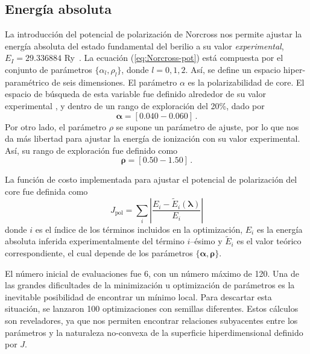 \subsection{Energía absoluta}

La introducción del potencial de polarización de Norcross nos permite
ajustar la energía absoluta del estado fundamental del berilio a su valor 
\textit{experimental}, $E_I=29.336884$ Ry~\cite{NIST}. La ecuación 
(\ref{eq:Norcross-pot}) está compuesta por el conjunto de parámetros 
$\{\alpha_l,\rho_l\}$, donde $l=0,1,2$. Así, se define un espacio 
hiper-paramétrico de seis dimensiones. El parámetro $\alpha$ es la 
polarizabilidad de core. El espacio de búsqueda de esta variable fue 
definido alrededor de su valor experimental \cite{Dalgarno:62,Sitz:71},
y dentro de un rango de exploración del 20\%, dado por
\begin{equation}
\boldsymbol\alpha=[0.040-0.060]\,.
\end{equation}
Por otro lado, el parámetro $\rho$ se supone un parámetro de ajuste, por 
lo que nos da más libertad para ajustar la energía de ionización con su 
valor experimental. Así, su rango de exploración fue definido como
\begin{equation}
\boldsymbol\rho=[0.50-1.50]\,.
\end{equation}

La función de costo implementada para ajustar el potencial de 
polarización del core fue definida como
\begin{equation}
J_{\mathrm{pol}} = \sum_{i} \left|\frac{E_{i}-\tilde{E}_{i}
(\boldsymbol{\lambda})}{E_{i}} \right|
\label{eq:Jpol}
\end{equation}
donde $i$ es el índice de los términos incluidos en la optimización, 
$E_{i}$ es la energía absoluta inferida experimentalmente del 
término $i$--ésimo y $\tilde{E}_{i}$ es el valor teórico correspondiente, 
el cual depende de los parámetros $\{\boldsymbol\alpha,\boldsymbol\rho\}$.

El número inicial de evaluaciones fue 6, con un número máximo de 120. Una 
de las grandes dificultades de la minimización u optimización de 
parámetros es la inevitable posibilidad de encontrar un mínimo local. 
Para descartar esta situación, se lanzaron 100 optimizaciones con 
semillas diferentes. Estos cálculos son reveladores, ya que nos permiten 
encontrar relaciones subyacentes entre los parámetros y la naturaleza 
no-convexa de la superficie hiperdimensional definido por $J$.

